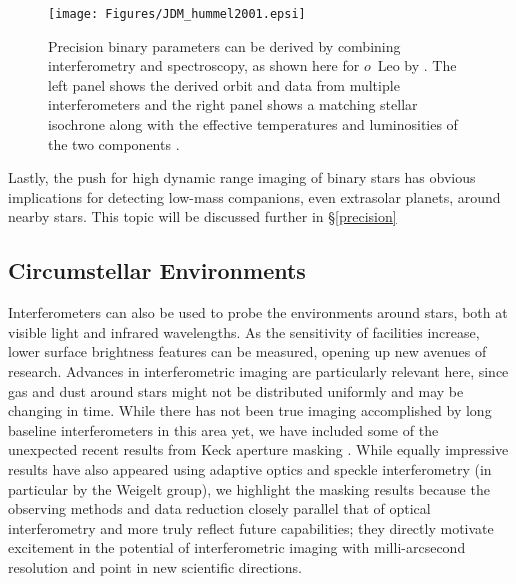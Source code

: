 \documentclass[12pt]{iopart}
\begin{document}
\begin{figure}[tbhp]
\begin{center}
\texttt{[image: Figures/JDM\_hummel2001.epsi]}
\caption{\footnotesize Precision binary parameters can be
  derived by combining interferometry and spectroscopy, as shown here
  for $o$~Leo by \citet{hummel2001}.  The left panel shows the derived
  orbit and data from multiple interferometers and the right panel
  shows a matching stellar isochrone along with the effective
  temperatures and luminosities of the two components \citep[see
  Figures~10 \&~11 in][reproduced with permission of the
  AAS]{hummel2001}.
\label{omicronleo}}
\end{center}
\end{figure}


Lastly, the push for high dynamic range imaging of binary stars
has obvious implications for detecting low-mass companions, even 
extrasolar planets, around nearby stars.  This topic will be discussed further
in \S\ref{precision}

\subsection{Circumstellar Environments}

Interferometers can also be used to probe the environments around
stars, both at visible light and infrared wavelengths.  As the
sensitivity of facilities increase, lower surface brightness features
can be measured, opening up new avenues of research.  Advances in
interferometric imaging are particularly relevant here, since gas and
dust around stars might not be distributed uniformly and may be
changing in time.  While there has not been true imaging accomplished
by long baseline interferometers in this area yet, we have included
some of the unexpected recent results from Keck aperture masking
\citep{tuthill2000}.  While equally impressive results have also
appeared using adaptive optics and speckle interferometry (in
particular by the Weigelt group), we highlight the masking results
because the observing methods and data reduction closely parallel that
of optical interferometry and more truly reflect future capabilities;
they directly motivate excitement in the potential of interferometric
imaging with milli-arcsecond resolution and point in new scientific
directions.
\end{document}
